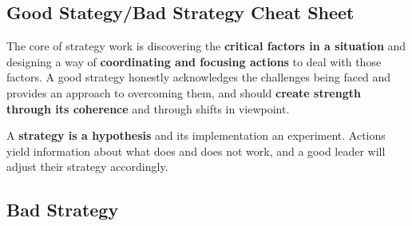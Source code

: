 \documentclass{article}
\begin{document}
\begin{center}
     \section{Good Stategy/Bad Strategy Cheat Sheet}
\end{center}

\begin{multicols}{2}

\noindent
The core of strategy work is discovering the \textbf{critical factors in a situation} and designing a way of \textbf{coordinating and focusing actions} to deal with those factors. A good strategy honestly acknowledges the challenges being faced and provides an approach to overcoming them, and should \textbf{create strength through its coherence} and through shifts in viewpoint.

A \textbf{strategy is a hypothesis} and its implementation an experiment. Actions yield information about what does and does not work, and a good leader will adjust their strategy accordingly.


\end{multicols}

\begin{center}
\section{Bad Strategy}
\end{center}
\end{document}
